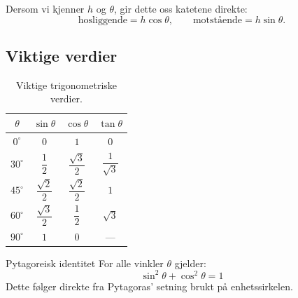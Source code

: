 Dersom vi kjenner $h$ og $\theta$, gir dette oss katetene direkte:
\[
\text{hosliggende} = h\cos\theta, \qquad \text{motstående} = h\sin\theta.
\]

\subsection*{Viktige verdier}

\begin{table}[H]
\centering
\renewcommand{\arraystretch}{1.55}
\begin{tabular}{|c|c|c|c|}
\hline
\rowcolor{blue!20!black!10}
$\theta$ & $\sin\theta$ & $\cos\theta$ & $\tan\theta$ \\
\hline
$0^\circ$  & $0$ & $1$ & $0$ \\
\hline
$30^\circ$ & $\dfrac{1}{2}$ & $\dfrac{\sqrt{3}}{2}$ & $\dfrac{1}{\sqrt{3}}$ \\
\hline
$45^\circ$ & $\dfrac{\sqrt{2}}{2}$ & $\dfrac{\sqrt{2}}{2}$ & $1$ \\
\hline
$60^\circ$ & $\dfrac{\sqrt{3}}{2}$ & $\dfrac{1}{2}$ & $\sqrt{3}$ \\
\hline
$90^\circ$ & $1$ & $0$ & — \\
\hline
\end{tabular}
\caption{Viktige trigonometriske verdier.}
\label{tab:trig}
\end{table}

\begin{myoppsum*}{Pytagoreisk identitet}
For alle vinkler $\theta$ gjelder:
\[
\sin^2\theta + \cos^2\theta = 1
\]
Dette følger direkte fra Pytagoras' setning brukt på enhetssirkelen.
\end{myoppsum*}


